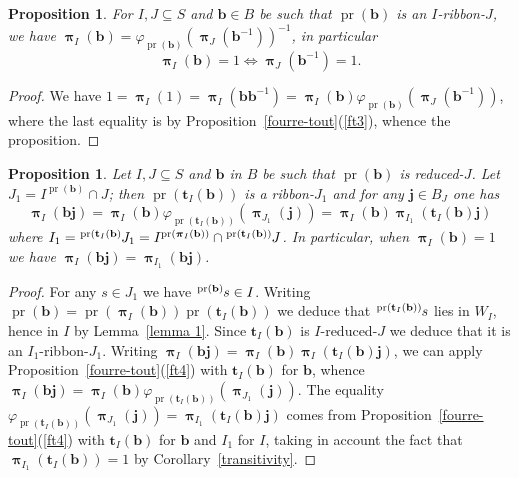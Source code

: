 \documentclass{amsart}
\numberwithin{equation}{section}
\newtheorem{lemma}[equation]{Lemma}
\newtheorem{proposition}[equation]{Proposition}
\newcommand\lexp[2]{\kern\scriptspace\vphantom{#2}^{#1}\kern-\scriptspace#2}
\newcommand\inv{^{-1}}
\newcommand\bb{{\mathbf b}}
\newcommand\bj{{\mathbf j}}
\newcommand\bt{{\mathbf t}}
\DeclareMathOperator\pr{pr}
\DeclareMathOperator\bpi{\boldsymbol\pi}
\begin{document}
\begin{proposition}\label{ribboninv} For $I,J\subseteq S$ and $\bb\in B$
be such that $\pr(\bb)$ is an $I$-ribbon-$J$, we have 
$\bpi_I(\bb)=\varphi_{\pr(\bb)}(\bpi_J(\bb\inv))\inv$, in particular
$$\bpi_I(\bb) = 1 \iff \bpi_J(\bb^{-1}) = 1.$$
\end{proposition}
\begin{proof}
We have $1 = \bpi_I(1) =
\bpi_I(\bb\bb^{-1})=\bpi_I(\bb)\varphi_{\pr(\bb)}(\bpi_J(\bb^{-1}))$, 
where the last equality is by Proposition~\ref{fourre-tout}(\ref{ft3}), 
whence the proposition.
\end{proof}
 
\begin{proposition}\label{ajout F} Let $I,J \subseteq S$  and $\bb$ in $B$ be such
that $\pr(\bb)$ is  reduced-$J$. Let $J_1=I^{\pr(\bb)}\cap J$; then 
$\pr(\bt_I(\bb))$ is a ribbon-$J_1$ and for any $\bj\in B_J$ 
one has $$\bpi_I(\bb\bj)=\bpi_I(\bb)\varphi_{\pr(\bt_I(\bb))}(\bpi_{J_1}(\bj))=
\bpi_I(\bb)\bpi_{I_1}(\bt_I(\bb)\bj)$$ where
$I_1=\lexp{\pr(\bt_I(\bb)}J_1=I^{\pr(\bpi_I(\bb))}\cap \lexp{\pr(\bt_I(\bb))}J$.
In particular, when $\bpi_I(\bb) = 1$ we have $\bpi_I(\bb\bj) = \bpi_{I_1}(\bb
 \bj)$.    
\end{proposition}
\begin{proof}
For any $s\in J_1$ we have
$\lexp{\pr(\bb)}s\in I$. Writing $\pr(\bb)=
\pr(\bpi_I(\bb))\pr(\bt_I(\bb))$ we deduce that $\lexp{\pr(\bt_I(\bb))}s$
lies in $W_I$, hence in $I$ by Lemma~\ref{lemma 1}.
Since $\bt_I(\bb)$ is $I$-reduced-$J$ we deduce that it 
is an $I_1$-ribbon-$J_1$.
Writing $\bpi_I(\bb\bj)=\bpi_I(\bb)\bpi_I(\bt_I(\bb)\bj)$,
 we can apply Proposition~\ref{fourre-tout}(\ref{ft4}) with $\bt_I(\bb)$ for $\bb$,
whence $\bpi_I(\bb\bj)=
\bpi_I(\bb)\varphi_{\pr(\bt_I(\bb))}(\bpi_{J_1}(\bj))$. The equality 
$\varphi_{\pr(\bt_I(\bb))}(\bpi_{J_1}(\bj))=\bpi_{I_1}(\bt_I(\bb)\bj)$ comes from
 Proposition~\ref{fourre-tout}(\ref{ft4}) with $\bt_I(\bb)$ for $\bb$ and $I_1$ for $I$, taking in account
 the fact that $\bpi_{I_1}(\bt_I(\bb))=1$ by Corollary~\ref{transitivity}.
\end{proof}
\end{document}
